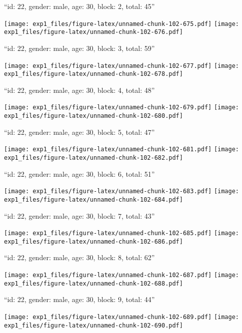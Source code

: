 \documentclass[11pt,,]{article}
\begin{document}
\newpage
[1] 

``id: 22, gender: male, age: 30, block: 2, total: 45''

\texttt{[image: exp1\_files/figure-latex/unnamed-chunk-102-675.pdf]}
\texttt{[image: exp1\_files/figure-latex/unnamed-chunk-102-676.pdf]}

\newpage
[1] 

``id: 22, gender: male, age: 30, block: 3, total: 59''

\texttt{[image: exp1\_files/figure-latex/unnamed-chunk-102-677.pdf]}
\texttt{[image: exp1\_files/figure-latex/unnamed-chunk-102-678.pdf]}

\newpage
[1] 

``id: 22, gender: male, age: 30, block: 4, total: 48''

\texttt{[image: exp1\_files/figure-latex/unnamed-chunk-102-679.pdf]}
\texttt{[image: exp1\_files/figure-latex/unnamed-chunk-102-680.pdf]}

\newpage
[1] 

``id: 22, gender: male, age: 30, block: 5, total: 47''

\texttt{[image: exp1\_files/figure-latex/unnamed-chunk-102-681.pdf]}
\texttt{[image: exp1\_files/figure-latex/unnamed-chunk-102-682.pdf]}

\newpage
[1] 

``id: 22, gender: male, age: 30, block: 6, total: 51''

\texttt{[image: exp1\_files/figure-latex/unnamed-chunk-102-683.pdf]}
\texttt{[image: exp1\_files/figure-latex/unnamed-chunk-102-684.pdf]}

\newpage
[1] 

``id: 22, gender: male, age: 30, block: 7, total: 43''

\texttt{[image: exp1\_files/figure-latex/unnamed-chunk-102-685.pdf]}
\texttt{[image: exp1\_files/figure-latex/unnamed-chunk-102-686.pdf]}

\newpage
[1] 

``id: 22, gender: male, age: 30, block: 8, total: 62''

\texttt{[image: exp1\_files/figure-latex/unnamed-chunk-102-687.pdf]}
\texttt{[image: exp1\_files/figure-latex/unnamed-chunk-102-688.pdf]}

\newpage
[1] 

``id: 22, gender: male, age: 30, block: 9, total: 44''

\texttt{[image: exp1\_files/figure-latex/unnamed-chunk-102-689.pdf]}
\texttt{[image: exp1\_files/figure-latex/unnamed-chunk-102-690.pdf]}
\end{document}
